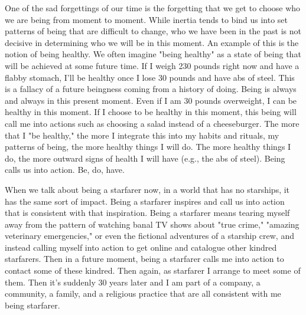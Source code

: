 \documentclass[ebook,11pt,openany,twoside,showtrims]{memoir}
\begin{document}
One of the sad forgettings of our time is the forgetting that we get to choose
who we are being from moment to moment. While inertia tends to bind us into set
patterns of being that are difficult to change, who we have been in the past is
not decisive in determining who we will be in this moment. An example of this
is the notion of being healthy. We often imagine "being healthy" as a state of
being that will be achieved at some future time. If I weigh 230 pounds right
now and have a flabby stomach, I'll be healthy once I lose 30 pounds and have
abs of steel. This is a fallacy of a future beingness coming from a history of
doing. Being is always and always in this present moment. Even if I am 30
pounds overweight, I can be healthy in this moment. If I choose to be healthy
in this moment, this being will call me into actions such as choosing a salad
instead of a cheeseburger. The more that I "be healthy," the more I integrate
this into my habits and rituals, my patterns of being, the more healthy things
I will do. The more healthy things I do, the more outward signs of health I
will have (e.g., the abs of steel). Being calls us into action. Be, do, have.

When we talk about being a starfarer now, in a world that has no starships, it
has the same sort of impact. Being a starfarer inspires and call us into action
that is consistent with that inspiration. Being a starfarer means tearing
myself away from the pattern of watching banal TV shows about "true crime,"
"amazing veterinary emergencies," or even the fictional adventures of a
starship crew, and instead calling myself into action to get online and
catalogue other kindred starfarers. Then in a future moment, being a starfarer
calls me into action to contact some of these kindred. Then again, as starfarer
I arrange to meet some of them. Then it's suddenly 30 years later and I am part
of a company, a community, a family, and a religious practice that are all
consistent with me being starfarer.

\newpage
\tableofcontents
\end{document}
